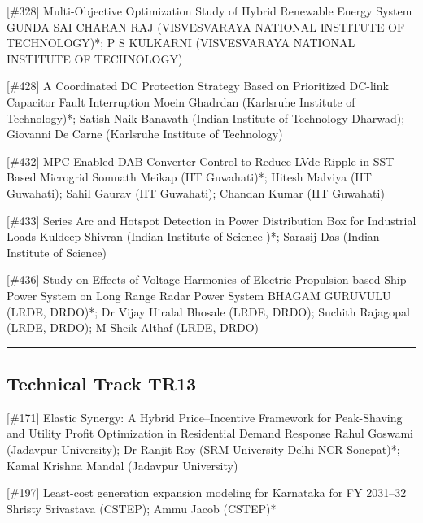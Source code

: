 {} \begin{abstract_online} {[\#328] Multi-Objective Optimization Study of Hybrid Renewable Energy System} {} {GUNDA SAI CHARAN RAJ (VISVESVARAYA NATIONAL INSTITUTE OF TECHNOLOGY)*; P S KULKARNI (VISVESVARAYA NATIONAL INSTITUTE OF TECHNOLOGY)} {}  \end{abstract_online} 
{} \begin{abstract_online} {[\#428] A Coordinated DC Protection Strategy Based on Prioritized DC-link Capacitor Fault Interruption} {} {Moein Ghadrdan (Karlsruhe Institute of Technology)*; Satish  Naik Banavath (Indian Institute of Technology Dharwad); Giovanni De Carne (Karlsruhe Institute of Technology)} {}  \end{abstract_online} 
{} \begin{abstract_online} {[\#432] MPC-Enabled DAB Converter Control to Reduce LVdc Ripple in SST-Based Microgrid} {} {Somnath Meikap (IIT Guwahati)*; Hitesh  Malviya (IIT Guwahati); Sahil Gaurav (IIT Guwahati); Chandan Kumar (IIT Guwahati)} {}  \end{abstract_online} 
{} \begin{abstract_online} {[\#433] Series Arc and Hotspot Detection in Power Distribution Box for Industrial Loads} {} {Kuldeep  Shivran (Indian Institute of Science )*; Sarasij Das (Indian Institute of Science)} {}  \end{abstract_online} 
{} \begin{abstract_online} {[\#436] Study on Effects of Voltage Harmonics of Electric Propulsion based Ship Power System on Long Range Radar Power System} {} {BHAGAM GURUVULU (LRDE, DRDO)*; Dr Vijay Hiralal Bhosale  (LRDE, DRDO); Suchith Rajagopal  (LRDE, DRDO); M Sheik Althaf (LRDE, DRDO)} {}  \end{abstract_online} 
\hrule  \subsection{Technical Track TR13}\nopagebreak {} \begin{abstract_online} {[\#171] Elastic Synergy: A Hybrid Price–Incentive Framework for Peak-Shaving and Utility Profit Optimization in Residential Demand Response} {} {Rahul Goswami (Jadavpur University); Dr Ranjit Roy (SRM University Delhi-NCR Sonepat)*; Kamal Krishna Mandal (Jadavpur University)} {}  \end{abstract_online} 
{} \begin{abstract_online} {[\#197] Least-cost generation expansion modeling for Karnataka for FY 2031–32} {} {Shristy Srivastava (CSTEP); Ammu Jacob (CSTEP)*} {}  \end{abstract_online} 
